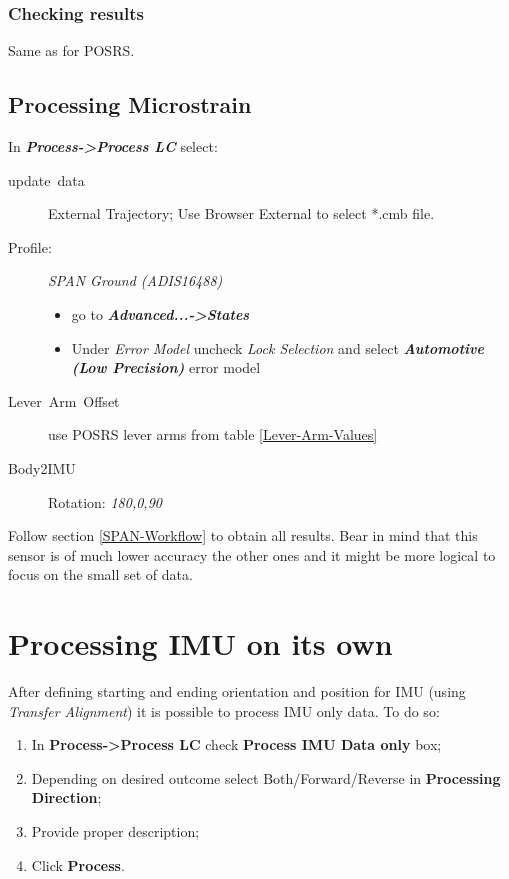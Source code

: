 \documentclass[british,DIV=calc, paper=a4, fontsize=12pt, onecolumn]{scrartcl}
\begin{document}
\subsubsection{Checking results}

Same as for POSRS.

\subsection{Processing Microstrain}\label{sub:Processing-Microstrain}

In \textbf{\emph{Process->Process LC}} select:
\begin{description}
	\item [{update~data}] External Trajectory; Use Browser External to select {*}.cmb file.
	\item [{Profile:}] \emph{SPAN Ground (ADIS16488) }
		\begin{itemize}
			\item go to \textbf{\emph{Advanced...->States}}
			\item Under \emph{Error Model} uncheck \emph{Lock Selection} and select \textbf{\emph{Automotive (Low Precision)}} error model
		\end{itemize}
	\item [{Lever~Arm~Offset}] use POSRS lever arms from table \ref{Lever-Arm-Values}
	\item [{Body2IMU}] Rotation: \emph{180,0,90 }
\end{description}

Follow section \ref{SPAN-Workflow} to obtain all results. Bear in mind that this sensor is of much lower accuracy the other ones and it might be more logical to focus on the small set of data.

\section{Processing IMU on its own}\label{Processing-IMU-on-its-own}
After defining starting and ending orientation and position for IMU (using \emph{Transfer Alignment}) it is possible to process IMU only data. To do so:
\begin{enumerate}
	\item In \textbf{Process->Process LC} check \textbf{Process IMU Data only }box;
	\item Depending on desired outcome select Both/Forward/Reverse in \textbf{Processing Direction};
	\item Provide proper description;
	\item Click \textbf{Process}.
\end{enumerate}
\end{document}

